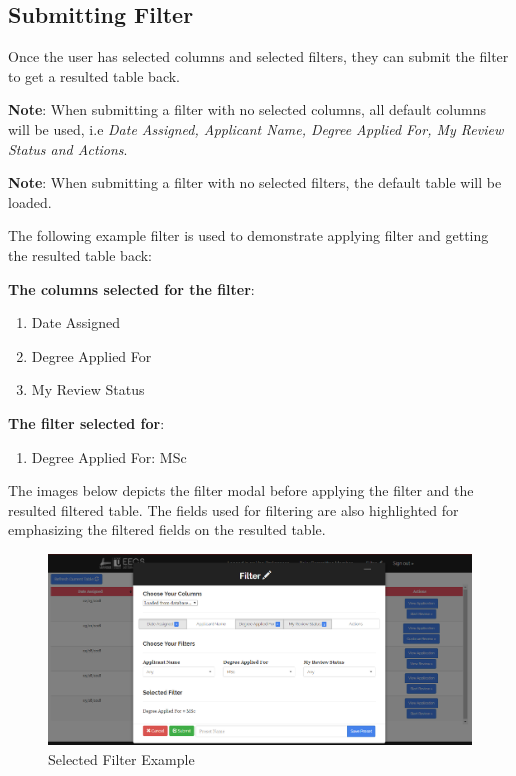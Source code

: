 \documentclass[fontsize=12pt,paper=letter,twoside]{scrartcl}
\begin{document}
\clearpage
\newpage
\subsection{Submitting Filter}

Once the user has selected columns and selected filters, they can submit the filter to get a resulted table back.

\bigskip
\noindent \textbf{Note}: When submitting a filter with no selected columns, all default columns will be used, i.e \emph{Date Assigned, Applicant Name, Degree Applied For, My Review Status and Actions}.

\bigskip
\noindent \textbf{Note}: When submitting a filter with no selected filters, the default table will be loaded.

\bigskip
\noindent The following example filter is used to demonstrate applying filter and getting the resulted table back:

\bigskip
\noindent \textbf{The columns selected for the filter}:
\begin{enumerate}
\item Date Assigned
\item Degree Applied For
\item My Review Status
\end{enumerate}

\noindent \textbf{The filter selected for}:
\begin{enumerate}
\item Degree Applied For: MSc
\end{enumerate}

\bigskip
\noindent The images below depicts the filter modal before applying the filter and the resulted filtered table. The fields used for filtering are also highlighted for emphasizing the filtered fields on the resulted table.

\begin{figure}[!htb]
\begin{center}
\includegraphics[width=.9\textwidth]{images/example_filter.png}
\end{center}
\caption{Selected Filter Example}
\label{fig:example_filter}
\end{figure}
\end{document}
